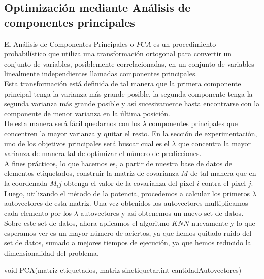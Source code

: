 \subsection{Optimización mediante Análisis de componentes principales}
El Análisis de Componentes Principales o $PCA$ es un procedimiento probabilístico que utiliza una transformación ortogonal para convertir un conjunto de variables, posiblemente correlacionadas, en un conjunto de variables linealmente independientes llamadas componentes principales.
\\
Esta transformación está definida de tal manera que la primera componente principal tenga la varianza más grande posible, la segunda componente tenga la segunda varianza más grande posible y así sucesivamente hasta encontrarse con la componente de menor varianza en la última posición.
\\
De esta manera será fácil quedarnos con los $\lambda$ componentes principales que concentren la mayor varianza y quitar el resto. En la sección de experimentación, uno de los objetivos principales será buscar cual es el $\lambda$ que concentra la mayor varianza de manera tal de optimizar el número de predicciones. 
\\
A fines prácticos, lo que hacemos es, a partir de nuestra base de datos de elementos etiquetados, construir la matriz de covarianza $M$ de tal manera que en la coordenada $M_ij$ obtenga el valor de la covarianza del pixel $i$ contra el pixel $j$.
\\
Luego, utilizando el método de la potencia, procedemos a calcular los primeros $\lambda$ autovectores de esta matriz. Una vez obtenidos los autovectores multiplicamos cada elemento por los $\lambda$ autovectores y asi obtenemos un nuevo set de datos.
\\
Sobre este set de datos, ahora aplicamos el algoritmo $KNN$ nuevamente y lo que esperamos ver es un mayor número de aciertos, ya que hemos quitado ruido del set de datos, sumado a mejores tiempos de ejecución, ya que hemos reducido la dimensionalidad del problema.
\\

\begin{algorithm}
\begin{algorithmic}[1]\parskip=1mm
\caption{void PCA(matriz etiquetados, matriz sinetiquetar,int cantidadAutovectores)}
\ENDFOR\\
\end{algorithmic}
\end{algorithm}
\\

